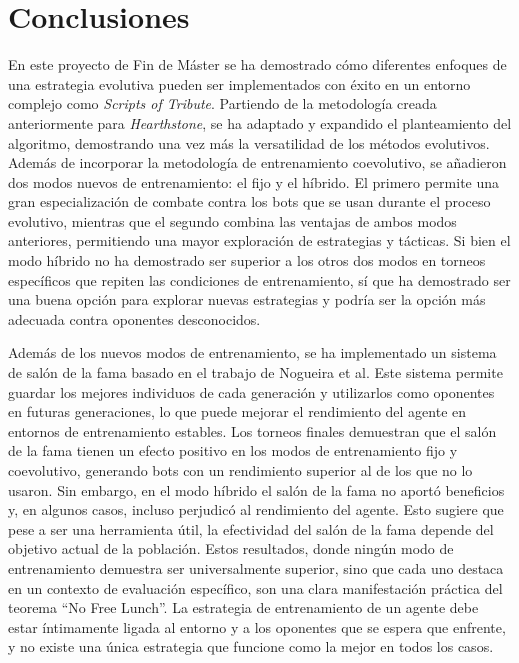\chapter{Conclusiones} \label{chap:conclusiones}

En este proyecto de Fin de Máster se ha demostrado cómo diferentes enfoques de una estrategia evolutiva pueden ser implementados con éxito en un entorno complejo como \textit{Scripts of Tribute}. Partiendo de la metodología creada anteriormente para \textit{Hearthstone}, se ha adaptado y expandido el planteamiento del algoritmo, demostrando una vez más la versatilidad de los métodos evolutivos. Además de incorporar la metodología de entrenamiento coevolutivo, se añadieron dos modos nuevos de entrenamiento: el fijo y el híbrido. El primero permite una gran especialización de combate contra los bots que se usan durante el proceso evolutivo, mientras que el segundo combina las ventajas de ambos modos anteriores, permitiendo una mayor exploración de estrategias y tácticas. Si bien el modo híbrido no ha demostrado ser superior a los otros dos modos en torneos específicos que repiten las condiciones de entrenamiento, sí que ha demostrado ser una buena opción para explorar nuevas estrategias y podría ser la opción más adecuada contra oponentes desconocidos.

Además de los nuevos modos de entrenamiento, se ha implementado un sistema de salón de la fama basado en el trabajo de Nogueira et al. Este sistema permite guardar los mejores individuos de cada generación y utilizarlos como oponentes en futuras generaciones, lo que puede mejorar el rendimiento del agente en entornos de entrenamiento estables. Los torneos finales demuestran que el salón de la fama tienen un efecto positivo en los modos de entrenamiento fijo y coevolutivo, generando bots con un rendimiento superior al de los que no lo usaron. Sin embargo, en el modo híbrido el salón de la fama no aportó beneficios y, en algunos casos, incluso perjudicó al rendimiento del agente. Esto sugiere que pese a ser una herramienta útil, la efectividad del salón de la fama depende del objetivo actual de la población. Estos resultados, donde ningún modo de entrenamiento demuestra ser universalmente superior, sino que cada uno destaca en un contexto de evaluación específico, son una clara manifestación práctica del teorema ``No Free Lunch''. La estrategia de entrenamiento de un agente debe estar íntimamente ligada al entorno y a los oponentes que se espera que enfrente, y no existe una única estrategia que funcione como la mejor en todos los casos.

